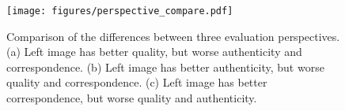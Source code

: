 \begin{figure}[t]
    \centering
    \texttt{[image: figures/perspective\_compare.pdf]}
    \caption{Comparison of the differences between three evaluation perspectives. (a) Left image has better quality, but worse authenticity and correspondence. (b) Left image has better authenticity, but worse quality and correspondence. (c) Left image has better correspondence, but worse quality and authenticity.}
    \label{fig:my_label}
\end{figure}